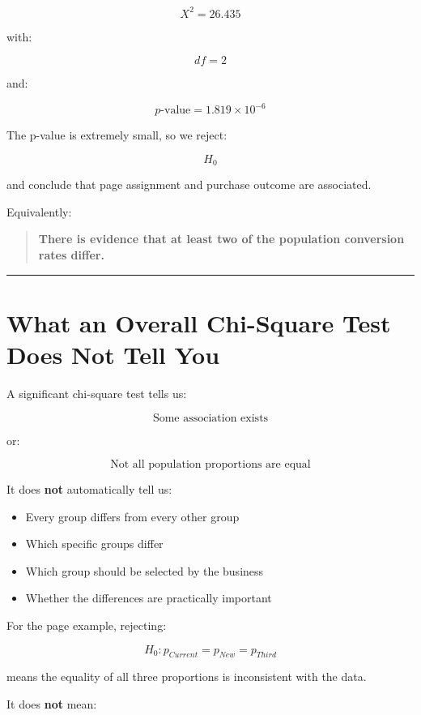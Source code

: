\documentclass[
  letterpaper,
  DIV=11,
  numbers=noendperiod]{scrreprt}
\providecommand{\tightlist}{%
  \setlength{\itemsep}{0pt}\setlength{\parskip}{0pt}}
\begin{document}
\[
X^2=26.435
\]

with:

\[
df=2
\]

and:

\[
p\text{-value}
=
1.819\times10^{-6}
\]

The p-value is extremely small, so we reject:

\[
H_0
\]

and conclude that page assignment and purchase outcome are associated.

Equivalently:

\begin{quote}
\textbf{There is evidence that at least two of the population conversion
rates differ.}
\end{quote}

\begin{center}\rule{0.5\linewidth}{0.5pt}\end{center}


\chapter{What an Overall Chi-Square Test Does Not Tell
You}\label{what-an-overall-chi-square-test-does-not-tell-you}

A significant chi-square test tells us:

\[
\boxed{
\text{Some association exists}
}
\]

or:

\[
\boxed{
\text{Not all population proportions are equal}
}
\]

It does \textbf{not} automatically tell us:

\begin{itemize}
\tightlist
\item
  Every group differs from every other group
\item
  Which specific groups differ
\item
  Which group should be selected by the business
\item
  Whether the differences are practically important
\end{itemize}

For the page example, rejecting:

\[
H_0:
p_{Current}=p_{New}=p_{Third}
\]

means the equality of all three proportions is inconsistent with the
data.

It does \textbf{not} mean:
\end{document}
